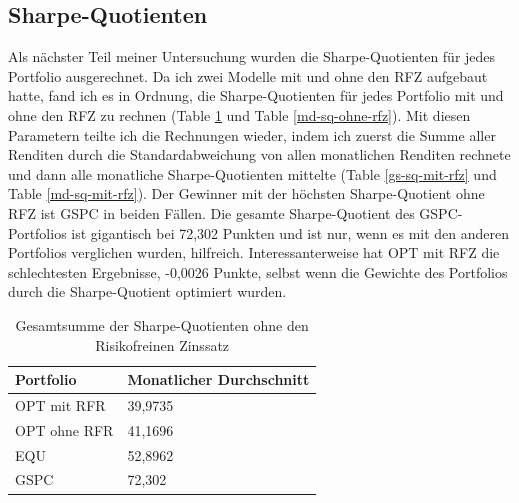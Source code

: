 \documentclass[12pt]{article}
\begin{document}
        \subsection{Sharpe-Quotienten}

        Als nächster Teil meiner Untersuchung wurden die Sharpe-Quotienten für jedes Portfolio ausgerechnet. 
        Da ich zwei Modelle mit und ohne den RFZ aufgebaut hatte, 
        fand ich es in Ordnung, die Sharpe-Quotienten für jedes Portfolio 
        mit und ohne den RFZ zu rechnen (Table \ref{gs-sq-ohne-rfz} und Table \ref{md-sq-ohne-rfz}). 
        Mit diesen Parametern teilte ich die Rechnungen wieder, 
        indem ich zuerst die Summe aller Renditen durch die Standardabweichung von allen monatlichen Renditen rechnete und 
        dann alle monatliche Sharpe-Quotienten mittelte (Table \ref{gs-sq-mit-rfz} und Table \ref{md-sq-mit-rfz}). 
        Der Gewinner mit der höchsten Sharpe-Quotient ohne RFZ ist GSPC in beiden Fällen. 
        Die gesamte Sharpe-Quotient des GSPC-Portfolios ist gigantisch bei 72,302 Punkten und ist nur, 
        wenn es mit den anderen Portfolios verglichen wurden, hilfreich. 
        Interessanterweise hat OPT mit RFZ die schlechtesten Ergebnisse, -0,0026 Punkte, 
        selbst wenn die Gewichte des Portfolios durch die Sharpe-Quotient optimiert wurden.

  
                
        \begin{table}[htp]
            \begin{center}
                
                \begin{tabular}{ | l | l | }

                    \hline
                    \textbf{Portfolio}   & \textbf{Monatlicher Durchschnitt} \\
                    \hline
                    OPT mit RFR          & 39,9735  \\          
                    OPT ohne RFR         & 41,1696 \\
                    EQU                  & 52,8962  \\              
                    GSPC                 & 72,302  \\       
                            
                    \hline

                \end{tabular}
                \caption{Gesamtsumme der Sharpe-Quotienten ohne den Risikofreinen Zinssatz}
                \label{gs-sq-ohne-rfz}

            \end{center}
        \end{table}
\end{document}
